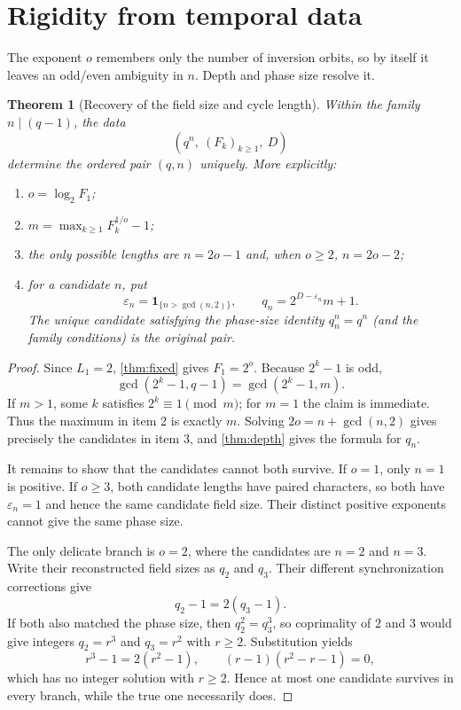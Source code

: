 \documentclass[11pt,a4paper]{amsart}
\newtheorem{theorem}{Theorem}[section]
\begin{document}
\section{Rigidity from temporal data}

The exponent $o$ remembers only the number of inversion orbits, so by itself
it leaves an odd/even ambiguity in $n$.  Depth and phase size resolve it.

\begin{theorem}[Recovery of the field size and cycle length]
\label{thm:rigidity}
Within the family $n\mid(q-1)$, the data
\begin{equation}
 \label{eq:data}
 \left(q^n,\ (F_k)_{k\geq1},\ D\right)
\end{equation}
determine the ordered pair $(q,n)$ uniquely.  More explicitly:
\begin{enumerate}
\item $o=\log_2F_1$;
\item $m=\max_{k\geq1}F_k^{1/o}-1$;
\item the only possible lengths are $n=2o-1$ and, when $o\geq2$,
      $n=2o-2$;
\item for a candidate $n$, put
\[
 \varepsilon_n=\mathbf1_{\{n>\gcd(n,2)\}},\qquad
 q_n=2^{D-\varepsilon_n}m+1.
\]
The unique candidate satisfying the phase-size identity $q_n^n=q^n$ (and
the family conditions) is the original pair.
\end{enumerate}
\end{theorem}

\begin{proof}
Since $L_1=2$, \cref{thm:fixed} gives $F_1=2^o$.  Because $2^k-1$ is odd,
\[
 \gcd(2^k-1,q-1)=\gcd(2^k-1,m).
\]
If $m>1$, some $k$ satisfies $2^k\equiv1\pmod m$; for $m=1$ the claim is
immediate.  Thus the maximum in item 2 is exactly $m$.  Solving
$2o=n+\gcd(n,2)$ gives precisely the candidates in item 3, and
\cref{thm:depth} gives the formula for $q_n$.

It remains to show that the candidates cannot both survive.  If $o=1$, only
$n=1$ is positive.  If $o\geq3$, both candidate lengths have paired
characters, so both have $\varepsilon_n=1$ and hence the same candidate
field size.  Their distinct positive exponents cannot give the same phase
size.

The only delicate branch is $o=2$, where the candidates are $n=2$ and
$n=3$.  Write their reconstructed field sizes as $q_2$ and $q_3$.  Their
different synchronization corrections give
\[
 q_2-1=2(q_3-1).
\]
If both also matched the phase size, then $q_2^2=q_3^3$, so coprimality of
$2$ and $3$ would give integers $q_2=r^3$ and $q_3=r^2$ with $r\geq2$.
Substitution yields
\[
 r^3-1=2(r^2-1),\qquad
 (r-1)(r^2-r-1)=0,
\]
which has no integer solution with $r\geq2$.  Hence at most one candidate
survives in every branch, while the true one necessarily does.
\end{proof}
\end{document}
